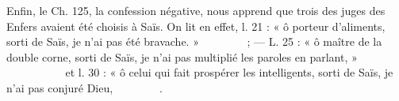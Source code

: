 \documentclass[letterpaper,twocolumn,openany,nodeprecatedcode]{dndbook}
\newcommand*\hieroAAAD{}
\newcommand*\hieroAAAG{}
\newcommand*\hieroAAAH{}
\newcommand*\hieroAAAW{\raisebox{0.5ex}{}}
\newcommand*\hieroAABC{\raisebox{0.5ex}{}}
\newcommand*\hieroAACJ{}
\newcommand*\hieroAACM{}
\newcommand*\hieroAACN{\raisebox{1ex}{}}
\newcommand*\hieroAADB{}
\newcommand*\hieroAADC{\raisebox{0.5ex}{}}
\newcommand*\hieroAADF{}
\newcommand*\hieroAADS{}
\newcommand*\hieroAADT{}
\newcommand*\hieroAADU{}
\newcommand*\hieroAADV{\raisebox{0.5ex}{}}
\newcommand*\hieroAADW{}
\newcommand*\hieroAADX{}
\newcommand*\hieroAADY{\raisebox{0.3ex}{}}
\newcommand*\hieroAADZ{}
\newcommand*\hieroAAEA{}
\newcommand*\hieroAAEB{}
\newcommand*\hieroAAEC{}
\newcommand*\hieroAAED{}
\newcommand*\hieroAAEE{}
\newcommand*\hieroAAEF{}
\newcommand*\hieroAAEG{}
\newcommand*\hieroAAEH{}
\newcommand*\hieroAAEI{}
\newcommand*\hieroAAEJ{}
\newcommand*\hieroAAEK{}
\begin{document}
Enfin, le Ch. 125, la confession négative, nous apprend que trois des juges des Enfers avaient été choisis à Saïs. On lit en effet, l. 21 : « ô porteur d'aliments, sorti de Saïs, je n'ai pas été bravache. » $\hieroAAAH\:\hieroAADF\:\hieroAACJ\:\hieroAACN\allowbreak\:\hieroAADS\:\hieroAADT\:\hieroAADU\:\hieroAADV\allowbreak\:\hieroAAAD\:\hieroAAAG\:\hieroAADC\:\hieroAAAW\allowbreak\:\hieroAADB\:\hieroAADW\:\hieroAADU\allowbreak\:\hieroAADX\:\hieroAADF$ ; --- L. 25 : « ô maître de la double corne, sorti de Saïs, je n'ai pas multiplié les paroles en parlant, » $\hieroAAAH\:\hieroAADF\:\hieroAABC\allowbreak\:\hieroAADY\:\hieroAADY\:\hieroAADU\allowbreak\:\hieroAADV\:\hieroAAAD\:\hieroAAAG\allowbreak\:\hieroAADC\:\hieroAAAW\:\hieroAADB\allowbreak\:\hieroAADW\:\hieroAADZ\:\hieroAAEA\allowbreak\:\hieroAACM\:\hieroAADF\:\hieroAAEB\allowbreak\:\hieroAAEC\:\hieroAAED\:\hieroAAEE\allowbreak\:\hieroAADF\:\hieroAAEF$ et l. 30 : « ô celui qui fait prospérer les intelligents, sorti de Saïs, je n'ai pas conjuré Dieu, $\hieroAAAH\:\hieroAADF\:\hieroAAEG\allowbreak\:\hieroAAEH\:\hieroAAEI\:\hieroAADU\allowbreak\:\hieroAADV\:\hieroAAAD\:\hieroAAAG\allowbreak\:\hieroAADC\:\hieroAAAW\:\hieroAADB\allowbreak\:\hieroAADW\:\hieroAAEJ\:\hieroAADF\allowbreak\:\hieroAAEB\:\hieroAAEK\:\hieroAADB$.
\end{document}
